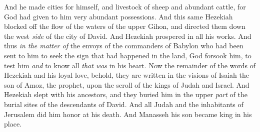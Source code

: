 \begin{biblechapter}
\verse And he made cities for himself, and livestock of sheep and abundant cattle, for God had given to him very abundant possessions.
\verse And this same Hezekiah blocked off the flow of the waters of the upper Gihon, and directed them down the west \textit{side} of the city of David. And Hezekiah prospered in all his works.
\verse And thus \textit{in the matter of} the envoys of the commanders of Babylon who had been sent to him to seek the sign that had happened in the land, God forsook him, to test him \textit{and} to know all \textit{that was} in his heart.
\verse Now the remainder of the words of Hezekiah and his loyal love, behold, they are written in the visions of Isaiah the son of Amoz, the prophet, upon the scroll of the kings of Judah and Israel.
\verse And Hezekiah slept with his ancestors, and they buried him in the upper \textit{part} of the burial sites of the descendants of David. And all Judah and the inhabitants of Jerusalem did him honor at his death. And Manasseh his son became king in his place.
\end{biblechapter}

